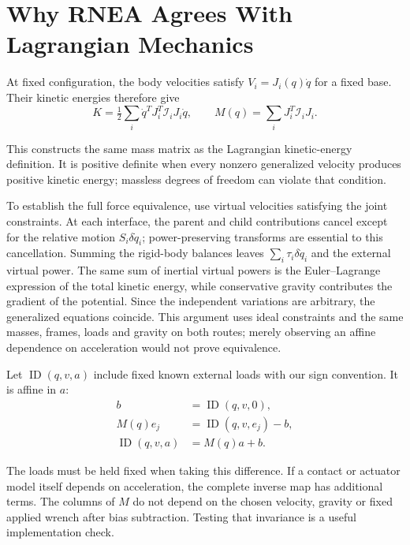 \section{Why RNEA Agrees With Lagrangian Mechanics}
\label{sec:rnea_lagrangian_equivalence}

At fixed configuration, the body velocities satisfy $V_i=J_i(q)\dot q$ for a fixed base. Their kinetic energies therefore give
\begin{equation}
 K=\tfrac12\sum_i\dot q^TJ_i^T\mathcal I_iJ_i\dot q,
 \qquad M(q)=\sum_iJ_i^T\mathcal I_iJ_i.
 \label{eq:rnea_mass_energy}
\end{equation}

This constructs the same mass matrix as the Lagrangian kinetic-energy definition. It is positive definite when every nonzero generalized velocity produces positive kinetic energy; massless degrees of freedom can violate that condition.

To establish the full force equivalence, use virtual velocities satisfying the joint constraints. At each interface, the parent and child contributions cancel except for the relative motion $S_i\delta\dot q_i$; power-preserving transforms are essential to this cancellation. Summing the rigid-body balances leaves $\sum_i\tau_i\delta\dot q_i$ and the external virtual power. The same sum of inertial virtual powers is the Euler--Lagrange expression of the total kinetic energy, while conservative gravity contributes the gradient of the potential. Since the independent variations are arbitrary, the generalized equations coincide. This argument uses ideal constraints and the same masses, frames, loads and gravity on both routes; merely observing an affine dependence on acceleration would not prove equivalence.

Let $\operatorname{ID}(q,v,a)$ include fixed known external loads with our sign convention. It is affine in $a$:
\begin{equation}
 \begin{aligned}
 b&=\operatorname{ID}(q,v,0),\\
 M(q)e_j&=\operatorname{ID}(q,v,e_j)-b,\\
 \operatorname{ID}(q,v,a)&=M(q)a+b.
 \end{aligned}
 \label{eq:rnea_mass_columns}
\end{equation}

The loads must be held fixed when taking this difference. If a contact or actuator model itself depends on acceleration, the complete inverse map has additional terms. The columns of $M$ do not depend on the chosen velocity, gravity or fixed applied wrench after bias subtraction. Testing that invariance is a useful implementation check.

